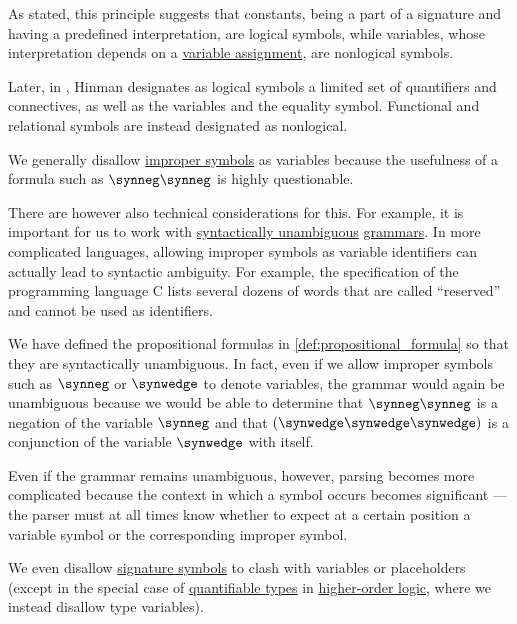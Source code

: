 \begin{remark}
\begin{itemize}
    As stated, this principle suggests that constants, being a part of a signature and having a predefined interpretation, are logical symbols, while variables, whose interpretation depends on a \hyperref[def:fol_variable_assignment]{variable assignment}, are nonlogical symbols.

    Later, in \cite[def. 2.1.2]{Hinman2005Logic}, Hinman designates as logical symbols a limited set of quantifiers and connectives, as well as the variables and the equality symbol. Functional and relational symbols are instead designated as nonlogical.
  \end{itemize}
\end{remark}

\begin{remark}\label{rem:improper_symbols_and_parsing}
  We generally disallow \hyperref[con:improper_symbol]{improper symbols} as variables because the usefulness of a formula such as \( \synneg \synneg \) is highly questionable.

  There are however also technical considerations for this. For example, it is important for us to work with \hyperref[def:grammar_ambiguity]{syntactically unambiguous} \hyperref[def:formal_grammar]{grammars}. In more complicated languages, allowing improper symbols as variable identifiers can actually lead to syntactic ambiguity. For example, the specification \cite[\S 6.4.1]{ISO:9899:2018} of the programming language C lists several dozens of words that are called \enquote{reserved} and cannot be used as identifiers.

  We have defined the propositional formulas in \cref{def:propositional_formula} so that they are syntactically unambiguous. In fact, even if we allow improper symbols such as \( \synneg \) or \( {\synwedge} \) to denote variables, the grammar would again be unambiguous because we would be able to determine that \( \synneg \synneg \) is a negation of the variable \( \synneg \) and that \( (\synwedge \synwedge \synwedge) \) is a conjunction of the variable \( {\synwedge} \) with itself.

  Even if the grammar remains unambiguous, however, parsing becomes more complicated because the context in which a symbol occurs becomes significant --- the parser must at all times know whether to expect at a certain position a variable symbol or the corresponding improper symbol.

  We even disallow \hyperref[con:logical_system_signature]{signature symbols} to clash with variables or placeholders (except in the special case of \hyperref[def:quantifiable_type]{quantifiable types} in \hyperref[def:higher_order_logic]{higher-order logic}, where we instead disallow type variables).
\end{remark}

